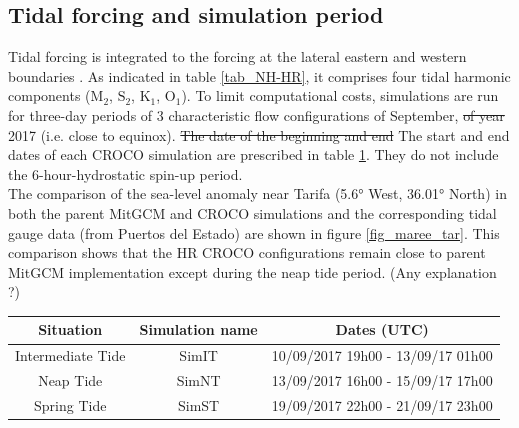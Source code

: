 \subsection{Tidal forcing and simulation period}
Tidal forcing is integrated to the forcing \color{blue} at the lateral eastern and western boundaries  \color{black}. As indicated in table \ref{tab_NH-HR}, it comprises four tidal harmonic \color{blue} components ($\text{M}_{\text{2}}$, $\text{S}_{\text{2}}$, $\text{K}_{\text{1}}$, $\text{O}_{\text{1}}$).
To limit computational costs\color{black}, simulations are run for three-day periods \color{blue}of 3 characteristic flow configurations of September, \sout{of year} 2017 (i.e. close to equinox). \sout{The date of the beginning and end} \color{blue}The start and end dates of each CROCO simulation are prescribed in table \ref{tab_dates_MIV}. \color{blue} They do \color{black} not include the 6-hour-hydrostatic spin-up period.\\ 

The comparison of the sea-level anomaly near Tarifa \color{blue}(5.6° West, 36.01° North) \color{black} in both the parent MitGCM and CROCO simulations and the corresponding tidal gauge data (from Puertos del Estado) are shown in figure \ref{fig_maree_tar}. \color{blue} This comparison shows that the HR CROCO configurations remain close to parent MitGCM implementation except during the neap tide period. \color{green}(Any explanation ?) \color{black}

\begin{table}[h]
        \centering
        \begin{tabular}{|c|c|c|}
                \hline
                Situation & Simulation name & Dates (UTC)\\
                \hline
                Intermediate Tide & SimIT & 10/09/2017 19h00 - 13/09/17 01h00  \\
                Neap Tide & SimNT & 13/09/2017 16h00 - 15/09/17 17h00 \\
                Spring Tide & SimST & 19/09/2017 22h00 - 21/09/17 23h00  \\
                \hline
        \end{tabular}
        \label{tab_dates_MIV}
\end{table}

